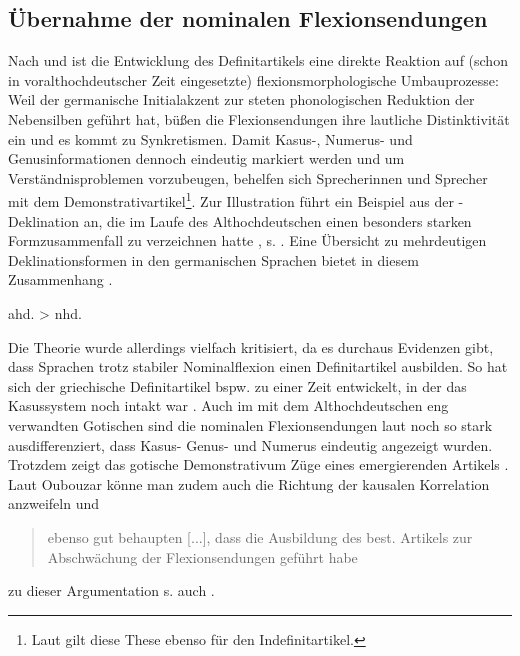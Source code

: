 \subsection{Übernahme der nominalen Flexionsendungen} \label{sec:flexion} 

Nach \textcite[168--170]{Tschirch1983} und \textcite[13]{vonPolenz2009} ist die Entwicklung des Definitartikels eine direkte Reaktion auf (schon in voralthochdeutscher Zeit eingesetzte) flexionsmorphologische Umbauprozesse: Weil der germanische Initialakzent zur steten phonologischen Reduktion der Nebensilben geführt hat, büßen die Flexionsendungen ihre lautliche Distinktivität ein und es kommt zu Synkretismen. Damit Kasus-, Numerus- und Genusinformationen dennoch eindeutig markiert werden und um Verständnisproblemen vorzubeugen, behelfen sich Sprecherinnen und Sprecher mit dem Demonstrativartikel\footnote{Laut \textcite[70]{Schildt1981} gilt diese These ebenso für den Indefinitartikel.}. Zur Illustration führt \textcite[13]{vonPolenz2009} ein Beispiel aus der -Deklination an, die im Laufe des Althochdeutschen einen besonders starken Formzusammenfall zu verzeichnen hatte \parencite[248]{Meineke2001}, s. . Eine Übersicht zu mehrdeutigen Deklinationsformen in den germanischen Sprachen bietet in diesem Zusammenhang \textcite[48--51]{Heinrichs1954}. 
 
\begin{exe}
	\ex \label{ex:flexion}   
	ahd.  > nhd. 
\end{exe}

Die Theorie wurde allerdings vielfach kritisiert, da es durchaus Evidenzen gibt, dass Sprachen trotz stabiler Nominalflexion einen Definitartikel ausbilden. So hat sich der griechische Definitartikel bspw. zu einer Zeit entwickelt, in der das Kasussystem noch intakt war \parencite[44]{Ebert1978}. 
Auch im mit dem Althochdeutschen eng verwandten Gotischen sind die nominalen Flexionsendungen laut \textcite[10]{Kovari1984} noch so stark ausdifferenziert, dass Kasus- Genus- und Numerus eindeutig angezeigt wurden. Trotzdem zeigt das gotische Demonstrativum Züge eines emergierenden Artikels \parencite[vgl.][114--155]{Leiss2000}. Laut Oubouzar könne man zudem auch die Richtung der kausalen Korrelation anzweifeln und \blockcquote[71]{Oubouzar1992}{ebenso gut behaupten
[...], dass die Ausbildung des best. Artikels zur Abschwächung der Flexionsendungen geführt habe}; zu dieser Argumentation s. auch \textcite[51]{Heinrichs1954}.  

